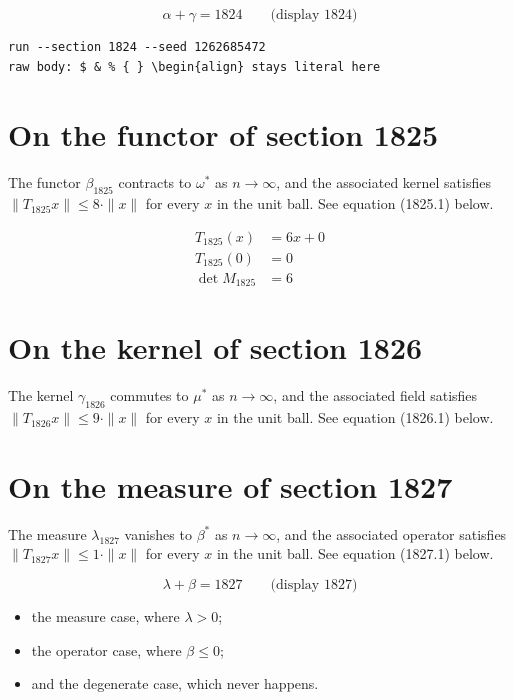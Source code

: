 \documentclass{article}
\begin{document}
$$
\alpha + \gamma = 1824 \qquad \text{(display 1824)}
$$

\begin{verbatim}
run --section 1824 --seed 1262685472
raw body: $ & % { } \begin{align} stays literal here
\end{verbatim}

\section{On the functor of section 1825}
The functor $\beta_{1825}$ contracts to $\omega^{*}$ as $n \to \infty$,
and the associated kernel satisfies $\|T_{1825} x\| \leq 8 \cdot \|x\|$
for every $x$ in the unit ball. See equation (1825.1) below.

\begin{align}
T_{1825}(x) &= 6 x + 0 \\
T_{1825}(0) &= 0 \\
\det M_{1825} &= 6
\end{align}

\section{On the kernel of section 1826}
The kernel $\gamma_{1826}$ commutes to $\mu^{*}$ as $n \to \infty$,
and the associated field satisfies $\|T_{1826} x\| \leq 9 \cdot \|x\|$
for every $x$ in the unit ball. See equation (1826.1) below.

\section{On the measure of section 1827}
The measure $\lambda_{1827}$ vanishes to $\beta^{*}$ as $n \to \infty$,
and the associated operator satisfies $\|T_{1827} x\| \leq 1 \cdot \|x\|$
for every $x$ in the unit ball. See equation (1827.1) below.

$$
\lambda + \beta = 1827 \qquad \text{(display 1827)}
$$

\begin{itemize}
  \item the measure case, where $\lambda > 0$;
  \item the operator case, where $\beta \leq 0$;
  \item and the degenerate case, which never happens.
\end{itemize}
\end{document}
